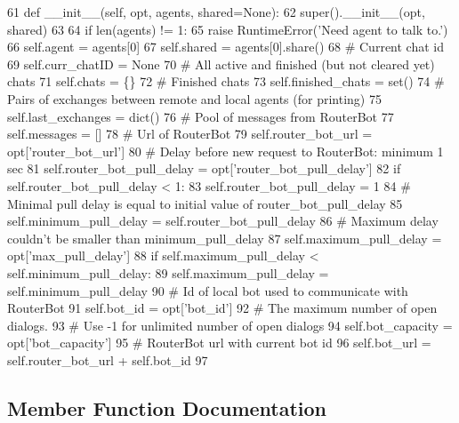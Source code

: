 \begin{DoxyCode}
61     \textcolor{keyword}{def }\_\_init\_\_(self, opt, agents, shared=None):
62         super().\_\_init\_\_(opt, shared)
63 
64         \textcolor{keywordflow}{if} len(agents) != 1:
65             \textcolor{keywordflow}{raise} RuntimeError(\textcolor{stringliteral}{'Need agent to talk to.'})
66         self.agent = agents[0]
67         self.shared = agents[0].share()
68         \textcolor{comment}{# Current chat id}
69         self.curr\_chatID = \textcolor{keywordtype}{None}
70         \textcolor{comment}{# All active and finished (but not cleared yet) chats}
71         self.chats = \{\}
72         \textcolor{comment}{# Finished chats}
73         self.finished\_chats = set()
74         \textcolor{comment}{# Pairs of exchanges between remote and local agents (for printing)}
75         self.last\_exchanges = dict()
76         \textcolor{comment}{# Pool of messages from RouterBot}
77         self.messages = []
78         \textcolor{comment}{# Url of RouterBot}
79         self.router\_bot\_url = opt[\textcolor{stringliteral}{'router\_bot\_url'}]
80         \textcolor{comment}{# Delay before new request to RouterBot: minimum 1 sec}
81         self.router\_bot\_pull\_delay = opt[\textcolor{stringliteral}{'router\_bot\_pull\_delay'}]
82         \textcolor{keywordflow}{if} self.router\_bot\_pull\_delay < 1:
83             self.router\_bot\_pull\_delay = 1
84         \textcolor{comment}{# Minimal pull delay is equal to initial value of router\_bot\_pull\_delay}
85         self.minimum\_pull\_delay = self.router\_bot\_pull\_delay
86         \textcolor{comment}{# Maximum delay couldn't be smaller than minimum\_pull\_delay}
87         self.maximum\_pull\_delay = opt[\textcolor{stringliteral}{'max\_pull\_delay'}]
88         \textcolor{keywordflow}{if} self.maximum\_pull\_delay < self.minimum\_pull\_delay:
89             self.maximum\_pull\_delay = self.minimum\_pull\_delay
90         \textcolor{comment}{# Id of local bot used to communicate with RouterBot}
91         self.bot\_id = opt[\textcolor{stringliteral}{'bot\_id'}]
92         \textcolor{comment}{# The maximum number of open dialogs.}
93         \textcolor{comment}{# Use -1 for unlimited number of open dialogs}
94         self.bot\_capacity = opt[\textcolor{stringliteral}{'bot\_capacity'}]
95         \textcolor{comment}{# RouterBot url with current bot id}
96         self.bot\_url = self.router\_bot\_url + self.bot\_id
97 
\end{DoxyCode}


\subsection{Member Function Documentation}
\mbox{\label{classprojects_1_1convai_1_1convai__world_1_1ConvAIWorld_afa6808254f400537a59fdd19d3574838}} 
